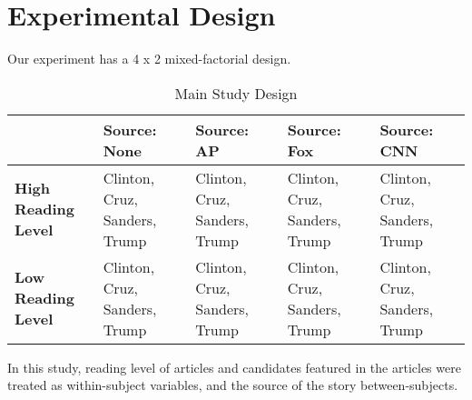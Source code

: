 \section{Experimental Design}
Our experiment has a 4 x 2 mixed-factorial design.
 
\begin{center}
\begin{table}[!htbp]
\begin{tabular}{ | m{5em} | m{7em}| m{7em} | m{7em} | m{7em} | } 
 \hline
  & \textbf{Source: None} & \textbf{Source: AP} & \textbf{Source: Fox} & \textbf{Source: CNN} \\
 \hline
 \textbf{High Reading Level} & Clinton, Cruz, Sanders, Trump & Clinton, Cruz, Sanders, Trump & Clinton, Cruz, Sanders, Trump & Clinton, Cruz, Sanders, Trump  \\ 
 \textbf{Low Reading Level} & Clinton, Cruz, Sanders, Trump & Clinton, Cruz, Sanders, Trump & Clinton, Cruz, Sanders, Trump & Clinton, Cruz, Sanders, Trump \\ 
 \hline
\end{tabular}
\caption{Main Study Design}
\label{study2}
\end{table}
\end{center}
\newpage


In this study, reading level of articles and candidates featured in the articles were treated as within-subject variables, and the source of the story between-subjects.




